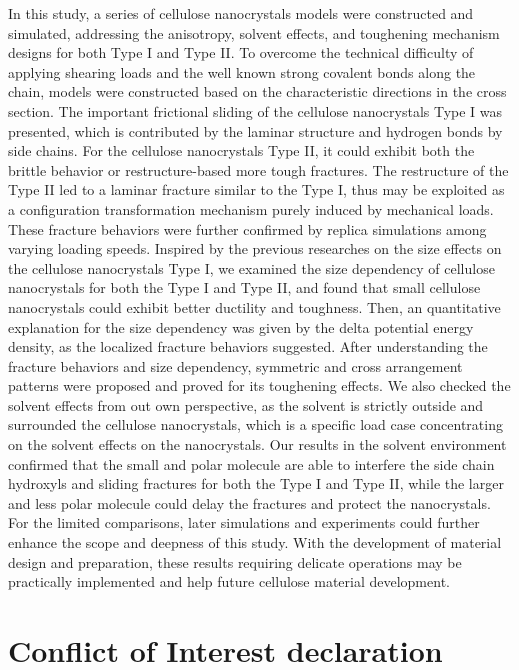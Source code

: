 \documentclass{article}
\begin{document}
In this study, a series of cellulose nanocrystals models were constructed and simulated, addressing the anisotropy, solvent effects, and toughening mechanism designs for both Type I and Type II.
To overcome the technical difficulty of applying shearing loads and the well known strong covalent bonds along the chain, models were constructed based on the characteristic directions in the cross section.
The important frictional sliding of the cellulose nanocrystals Type I was presented, which is contributed by the laminar structure and hydrogen bonds by side chains.
For the cellulose nanocrystals Type II, it could exhibit both the brittle behavior or restructure-based more tough fractures.
The restructure of the Type II led to a laminar fracture similar to the Type I, thus may be exploited as a configuration transformation mechanism purely induced by mechanical loads.
These fracture behaviors were further confirmed by replica simulations among varying loading speeds.
Inspired by the previous researches on the size effects on the cellulose nanocrystals Type I, we examined the size dependency of cellulose nanocrystals for both the Type I and Type II, and found that small cellulose nanocrystals could exhibit better ductility and toughness.
Then, an quantitative explanation for the size dependency was given by the delta potential energy density, as the localized fracture behaviors suggested.
After understanding the fracture behaviors and size dependency, symmetric and cross arrangement patterns were proposed and proved for its toughening effects.
We also checked the solvent effects from out own perspective, as the solvent is strictly outside and surrounded the cellulose nanocrystals, which is a specific load case concentrating on the solvent effects on the nanocrystals.
Our results in the solvent environment confirmed that the small and polar molecule are able to interfere the side chain hydroxyls and sliding fractures for both the Type I and Type II, while the larger and less polar molecule could delay the fractures and protect the nanocrystals.
For the limited comparisons, later simulations and experiments could further enhance the scope and deepness of this study.
With the development of material design and preparation, these results requiring delicate operations may be practically implemented and help future cellulose material development.

\section*{Conflict of Interest declaration}
\addtocounter{section}{1}
\setcounter{subsection}{0}
\indent
\end{document}

